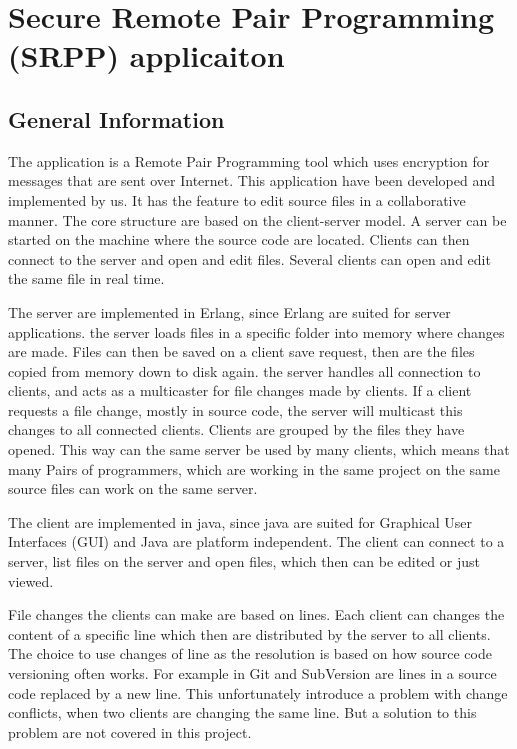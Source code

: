 \section{Secure Remote Pair Programming (SRPP) applicaiton}

\subsection{General Information}

The application is a Remote Pair Programming tool which uses encryption for messages that are sent over Internet. This application have been developed and implemented by us. It has the feature to edit source files in a collaborative manner. The core structure are based on the client-server model. A server can be started on the machine where the source code are located. Clients can then connect to the server and open and edit files. Several clients can open and edit the same file in real time. 

The server are implemented in Erlang, since Erlang are suited for server applications. the server loads files in a specific folder into memory where changes are made. Files can then be saved on a client save request, then are the files copied from memory down to disk again. the server handles all connection to clients, and acts as a multicaster for file changes made by clients. If a client requests a file change, mostly in source code, the server will multicast this changes to all connected clients. Clients are grouped by the files they have opened. This way can the same server be used by many clients, which means that many Pairs of programmers, which are working in the same project on the same source files can work on the same server. 

The client are implemented in java, since java are suited for Graphical User Interfaces (GUI) and Java are platform independent. The client can connect to a server, list files on the server and open files, which then can be edited or just viewed. 

File changes the clients can make are based on lines. Each client can changes the content of a specific line which then are distributed by the server to all clients. The choice to use changes of line as the resolution is based on how source code versioning often works. For example in Git and SubVersion are lines in a source code replaced by a new line. This unfortunately introduce a problem with change conflicts, when two clients are changing the same line. But a solution to this problem are not covered in this project.  


